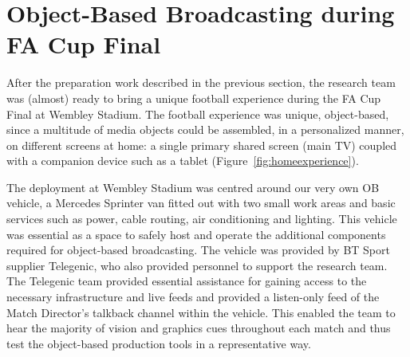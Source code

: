 \documentclass[sigchi-a, authorversion]{acmart}
\begin{document}
\section{Object-Based Broadcasting during FA Cup Final}
After the preparation work described in the previous section, the research team
was (almost) ready to bring a unique football experience during the FA Cup Final
at Wembley Stadium. The football experience was unique, object-based, since a
multitude of media objects could be assembled, in a personalized manner, on
different screens at home: a single primary shared screen (main TV) coupled with
a companion device such as a tablet (Figure~\ref{fig:homeexperience}).


The deployment at Wembley Stadium was centred around our very own OB vehicle, a
Mercedes Sprinter van fitted out with two small work areas and basic services
such as power, cable routing, air conditioning and lighting. This vehicle was
essential as a space to safely host and operate the additional components
required for object-based broadcasting. The vehicle was provided by BT Sport
supplier Telegenic, who also provided personnel to support the research team.
The Telegenic team provided essential assistance for gaining access to the
necessary infrastructure and live feeds and provided a listen-only feed of the
Match Director's talkback channel within the vehicle. This enabled the team to
hear the majority of vision and graphics cues throughout each match and thus
test the object-based production tools in a representative way.
\end{document}
